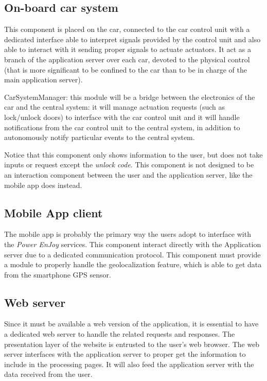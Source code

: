 \documentclass{scrreprt}
\begin{document}
\subsection{On-board car system}
This component is placed on the car, connected to the car control unit with a dedicated interface able to interpret signals provided by the control unit and also able to interact with it sending proper signals to actuate actuators.
It act as a branch of the application server over each car, devoted to the physical control (that is more significant to be confined to the car than to be in charge of the main application server).

CarSystemManager: this module will be a bridge between the electronics of the car and the central system: it will manage actuation requests (such as lock/unlock doors) to interface with the car control unit and it will handle notifications from the car control unit to the central system, in addition to autonomously notify particular events to the central system.

Notice that this component only shows information to the user, but does not take inputs or request except the \emph{unlock code}. This component is not designed to be an interaction component between the user and the application server, like the mobile app does instead.

\subsection{Mobile App client}
The mobile app is probably the primary way the users adopt to interface with the \emph{Power EnJoy} services.
This component interact directly with the Application server due to a dedicated communication protocol.
This component must provide a module to properly handle the geolocalization feature, which is able to get data from the smartphone GPS sensor.

\subsection{Web server}
Since it must be available a web version of the application, it is essential to have a dedicated web server to handle the related requests and responses. The presentation layer of the website is entrusted to the user's web browser.
The web server interfaces with the application server to proper get the information to include in the processing pages. It will also feed the application server with the data received from the user.
\end{document}
